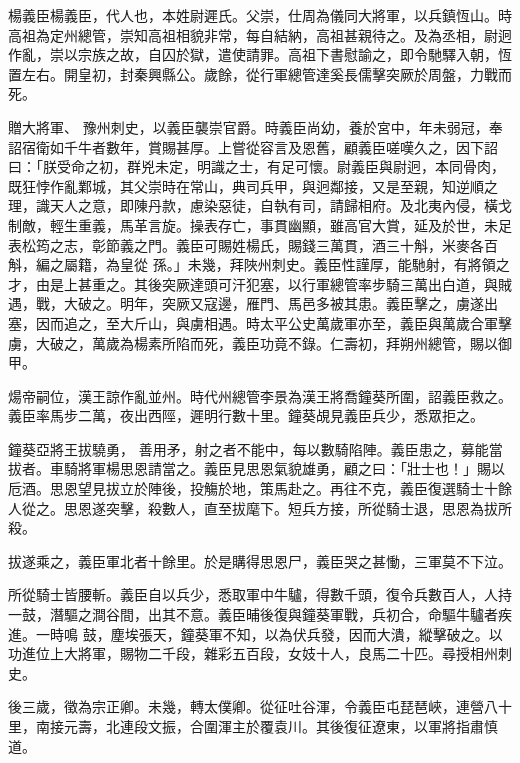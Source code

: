 \begin{pinyinscope}
 楊義臣楊義臣，代人也，本姓尉遲氏。父崇，仕周為儀同大將軍，以兵鎮恆山。時高祖為定州總管，崇知高祖相貌非常，每自結納，高祖甚親待之。及為丞相，尉迥作亂，崇以宗族之故，自囚於獄，遣使請罪。高祖下書慰諭之，即令馳驛入朝，恆置左右。開皇初，封秦興縣公。歲餘，從行軍總管達奚長儒擊突厥於周盤，力戰而死。



 贈大將軍、
 豫州刺史，以義臣襲崇官爵。時義臣尚幼，養於宮中，年未弱冠，奉詔宿衛如千牛者數年，賞賜甚厚。上嘗從容言及恩舊，顧義臣嗟嘆久之，因下詔曰：「朕受命之初，群兇未定，明識之士，有足可懷。尉義臣與尉迥，本同骨肉，既狂悖作亂鄴城，其父崇時在常山，典司兵甲，與迥鄰接，又是至親，知逆順之理，識天人之意，即陳丹款，慮染惡徒，自執有司，請歸相府。及北夷內侵，橫戈制敵，輕生重義，馬革言旋。操表存亡，事貫幽顯，雖高官大賞，延及於世，未足表松筠之志，彰節義之門。義臣可賜姓楊氏，賜錢三萬貫，酒三十斛，米麥各百斛，編之屬籍，為皇從
 孫。」未幾，拜陜州刺史。義臣性謹厚，能馳射，有將領之才，由是上甚重之。其後突厥達頭可汗犯塞，以行軍總管率步騎三萬出白道，與賊遇，戰，大破之。明年，突厥又寇邊，雁門、馬邑多被其患。義臣擊之，虜遂出塞，因而追之，至大斤山，與虜相遇。時太平公史萬歲軍亦至，義臣與萬歲合軍擊虜，大破之，萬歲為楊素所陷而死，義臣功竟不錄。仁壽初，拜朔州總管，賜以御甲。



 煬帝嗣位，漢王諒作亂並州。時代州總管李景為漢王將喬鐘葵所圍，詔義臣救之。義臣率馬步二萬，夜出西陘，遲明行數十里。鐘葵覘見義臣兵少，悉眾拒之。



 鐘葵亞將王拔驍勇，
 善用矛，射之者不能中，每以數騎陷陣。義臣患之，募能當拔者。車騎將軍楊思恩請當之。義臣見思恩氣貌雄勇，顧之曰：「壯士也！」賜以卮酒。思恩望見拔立於陣後，投觴於地，策馬赴之。再往不克，義臣復選騎士十餘人從之。思恩遂突擊，殺數人，直至拔麾下。短兵方接，所從騎士退，思恩為拔所殺。



 拔遂乘之，義臣軍北者十餘里。於是購得思恩尸，義臣哭之甚慟，三軍莫不下泣。



 所從騎士皆腰斬。義臣自以兵少，悉取軍中牛驢，得數千頭，復令兵數百人，人持一鼓，潛驅之澗谷間，出其不意。義臣晡後復與鐘葵軍戰，兵初合，命驅牛驢者疾進。一時鳴
 鼓，塵埃張天，鐘葵軍不知，以為伏兵發，因而大潰，縱擊破之。以功進位上大將軍，賜物二千段，雜彩五百段，女妓十人，良馬二十匹。尋授相州刺史。



 後三歲，徵為宗正卿。未幾，轉太僕卿。從征吐谷渾，令義臣屯琵琶峽，連營八十里，南接元壽，北連段文振，合圍渾主於覆袁川。其後復征遼東，以軍將指肅慎道。




\end{pinyinscope}
